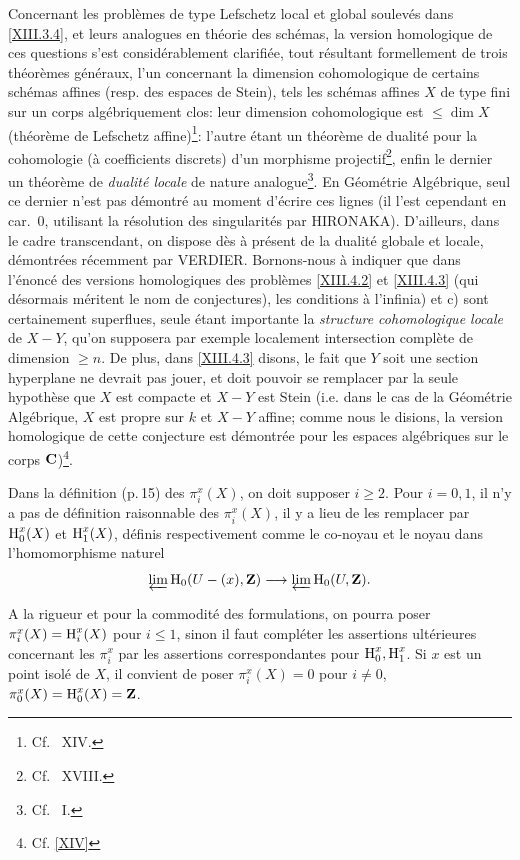 Concernant les probl\`emes de type Lefschetz local et global soulev\'es dans \ref{XIII.3.4}, et leurs analogues en th\'eorie des sch\'emas, la version homologique de ces questions s'est consid\'erablement clarifi\'ee, tout r\'esultant formellement de trois th\'eor\`emes g\'en\'eraux, l'un concernant la dimension cohomologique de certains sch\'emas affines (resp. des espaces de Stein), tels les sch\'emas affines $X$ de type fini sur un corps alg\'ebriquement clos: leur dimension cohomologique est $\leq\dim X$ (\og th\'eor\`eme de Lefschetz affine{\fg})\footnote{Cf. ~XIV.}: l'autre \'etant un th\'eor\`eme de dualit\'e pour la cohomologie (\`a coefficients discrets) d'un morphisme projectif\footnote{Cf. ~XVIII.}, enfin le dernier un th\'eor\`eme de \emph{dualité locale} de nature analogue\footnote{Cf. ~I.}. En G\'eom\'etrie Alg\'ebrique, seul ce dernier n'est pas d\'emontr\'e au moment d'\'ecrire ces lignes (il l'est cependant en car.~$0$, utilisant la r\'esolution des singularit\'es par HIRONAKA). D'ailleurs, dans le cadre transcendant, on dispose d\`es \`a pr\'esent de la dualit\'e globale et locale, d\'emontr\'ees r\'ecemment par VERDIER. Bornons-nous \`a indiquer que dans l'\'enonc\'e des versions homologiques des probl\`emes \ref{XIII.4.2} et \ref{XIII.4.3} (qui d\'esormais m\'eritent le nom de conjectures), les conditions \og \`a l'infini\fg a) et c) sont certainement superflues, seule \'etant importante la \emph{structure cohomologique locale} de $X-Y$, qu'on supposera par exemple localement intersection compl\`ete de dimension $\geq n$. De plus, dans \ref{XIII.4.3} disons, le fait que $Y$ soit une section hyperplane ne devrait pas jouer, et doit pouvoir se remplacer par la seule hypoth\`ese que $X$ est compacte et $X-Y$ est Stein (i.e. dans le cas de la G\'eom\'etrie Alg\'ebrique, $X$ est propre sur $k$ et $X-Y$ affine; comme nous le disions, la version homologique de cette conjecture est d\'emontr\'ee pour les espaces alg\'ebriques sur le corps $\mathbf{C}$)\footnote{Cf. \Exp \ref{XIV}}.

\label{p25y}%
Dans la d\'efinition (p.\,15) des $\pi_i^x(X)$, on doit supposer $i\geq 2$. Pour $i=0, 1$, il n'y a pas de d\'efinition raisonnable des $\pi_i^x(X)$, il y a lieu de les remplacer par $\operatorname{H}_0^x(X)$ et $\operatorname{H}_1^x(X)$, d\'efinis respectivement comme le co-noyau et le noyau dans l'homomorphisme naturel
$$
\varprojlim \H_0(U-(x), \ZZ)\to\varprojlim\H_0(U, \ZZ).
$$

A la rigueur et pour la commodit\'e des formulations, on pourra poser $\pi_i^x(X)=\operatorname{H}_i^x(X)$ pour $i\leq 1$, sinon il faut compl\'eter les assertions ult\'erieures concernant les $\pi_i^x$ par les assertions correspondantes pour $\operatorname{H}_0^x, \operatorname{H}_1^x$. Si $x$ est un point isol\'e de $X$, il convient de poser $\pi_i^x(X)=0$ pour $i\neq 0$, $\pi_0^x(X)=\operatorname{H}_0^x(X)=\mathbf{Z}$.

